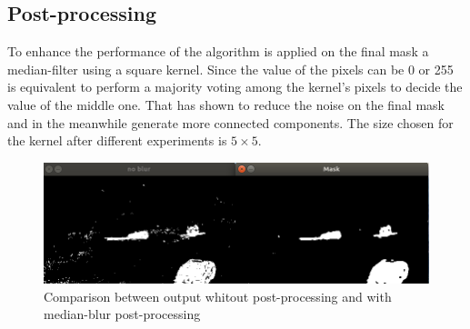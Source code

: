 \subsection{Post-processing}
To enhance the performance of the algorithm is applied on the final mask a median-filter using a square kernel. Since the value of the pixels can be 0 or 255 is equivalent to perform a majority voting among the kernel's pixels to decide the value of the middle one. That has shown to reduce the noise on the final mask and in the meanwhile generate more connected components. The size chosen for the kernel after different experiments is $5\times 5$.

\begin{figure}
\includegraphics[width=\linewidth]{Figures/median_blur.png}
\caption{Comparison between output whitout post-processing and with median-blur post-processing}
\end{figure}



